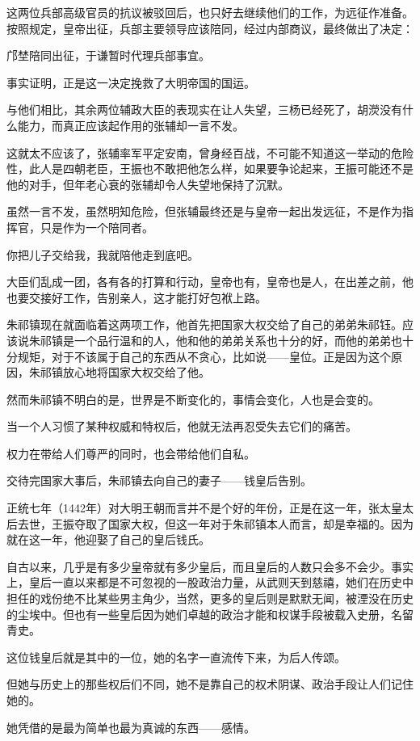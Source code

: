 \begin{multicols}{\theparacolNo}
这两位兵部高级官员的抗议被驳回后，也只好去继续他们的工作，为远征作准备。按照规定，皇帝出征，兵部主要领导应该陪同，经过内部商议，最终做出了决定：

邝埜陪同出征，于谦暂时代理兵部事宜。

事实证明，正是这一决定挽救了大明帝国的国运。

与他们相比，其余两位辅政大臣的表现实在让人失望，三杨已经死了，胡濙没有什么能力，而真正应该起作用的张辅却一言不发。

这就太不应该了，张辅率军平定安南，曾身经百战，不可能不知道这一举动的危险性，此人是四朝老臣，王振也不敢把他怎么样，如果要争论起来，王振可能还不是他的对手，但年老心衰的张辅却令人失望地保持了沉默。

虽然一言不发，虽然明知危险，但张辅最终还是与皇帝一起出发远征，不是作为指挥官，只是作为一个陪同者。

你把儿子交给我，我就陪他走到底吧。

大臣们乱成一团，各有各的打算和行动，皇帝也有，皇帝也是人，在出差之前，他也要交接好工作，告别亲人，这才能打好包袱上路。

朱祁镇现在就面临着这两项工作，他首先把国家大权交给了自己的弟弟朱祁钰。应该说朱祁镇是一个品行温和的人，他和他的弟弟关系也十分的好，而他的弟弟也十分规矩，对于不该属于自己的东西从不贪心，比如说——皇位。正是因为这个原因，朱祁镇放心地将国家大权交给了他。

然而朱祁镇不明白的是，世界是不断变化的，事情会变化，人也是会变的。

当一个人习惯了某种权威和特权后，他就无法再忍受失去它们的痛苦。

权力在带给人们尊严的同时，也会带给他们自私。

交待完国家大事后，朱祁镇去向自己的妻子——钱皇后告别。

正统七年（1442年）对大明王朝而言并不是个好的年份，正是在这一年，张太皇太后去世，王振夺取了国家大权，但这一年对于朱祁镇本人而言，却是幸福的。因为就在这一年，他迎娶了自己的皇后钱氏。

自古以来，几乎是有多少皇帝就有多少皇后，而且皇后的人数只会多不会少。事实上，皇后一直以来都是不可忽视的一股政治力量，从武则天到慈禧，她们在历史中担任的戏份绝不比某些男主角少，当然，更多的皇后则是默默无闻，被湮没在历史的尘埃中。但也有一些皇后因为她们卓越的政治才能和权谋手段被载入史册，名留青史。

这位钱皇后就是其中的一位，她的名字一直流传下来，为后人传颂。

但她与历史上的那些权后们不同，她不是靠自己的权术阴谋、政治手段让人们记住她的。

她凭借的是最为简单也最为真诚的东西——感情。


\end{multicols}
